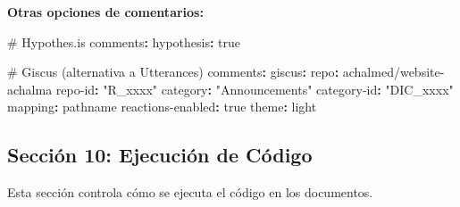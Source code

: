 \documentclass[
  doc,
  floatsintext,
  longtable,
  a4paper,
  nolmodern,
  notxfonts,
  notimes,
  12pt,
  colorlinks=true,linkcolor=blue,citecolor=blue,urlcolor=blue]{apa7}
\newenvironment{Shaded}{\begin{snugshade}}{\end{snugshade}}
\newcommand{\AttributeTok}[1]{\textcolor[rgb]{0.40,0.45,0.13}{#1}}
\newcommand{\CharTok}[1]{\textcolor[rgb]{0.13,0.47,0.30}{#1}}
\newcommand{\CommentTok}[1]{\textcolor[rgb]{0.37,0.37,0.37}{#1}}
\newcommand{\FunctionTok}[1]{\textcolor[rgb]{0.28,0.35,0.67}{#1}}
\newcommand{\KeywordTok}[1]{\textcolor[rgb]{0.00,0.23,0.31}{\textbf{#1}}}
\newcommand{\StringTok}[1]{\textcolor[rgb]{0.13,0.47,0.30}{#1}}
\begin{document}
\textbf{Otras opciones de comentarios:}

\begin{Shaded}
\begin{Highlighting}[]
\CommentTok{\# Hypothes.is}
\FunctionTok{comments}\KeywordTok{:}
\AttributeTok{  }\FunctionTok{hypothesis}\KeywordTok{:}\AttributeTok{ }\CharTok{true}

\CommentTok{\# Giscus (alternativa a Utterances)}
\FunctionTok{comments}\KeywordTok{:}
\AttributeTok{  }\FunctionTok{giscus}\KeywordTok{:}
\AttributeTok{    }\FunctionTok{repo}\KeywordTok{:}\AttributeTok{ achalmed/website{-}achalma}
\AttributeTok{    }\FunctionTok{repo{-}id}\KeywordTok{:}\AttributeTok{ }\StringTok{"R\_xxxx"}
\AttributeTok{    }\FunctionTok{category}\KeywordTok{:}\AttributeTok{ }\StringTok{"Announcements"}
\AttributeTok{    }\FunctionTok{category{-}id}\KeywordTok{:}\AttributeTok{ }\StringTok{"DIC\_xxxx"}
\AttributeTok{    }\FunctionTok{mapping}\KeywordTok{:}\AttributeTok{ pathname}
\AttributeTok{    }\FunctionTok{reactions{-}enabled}\KeywordTok{:}\AttributeTok{ }\CharTok{true}
\AttributeTok{    }\FunctionTok{theme}\KeywordTok{:}\AttributeTok{ light}
\end{Highlighting}
\end{Shaded}

\subsection{Sección 10: Ejecución de
Código}\label{secciuxf3n-10-ejecuciuxf3n-de-cuxf3digo}

Esta sección controla cómo se ejecuta el código en los documentos.
\end{document}
